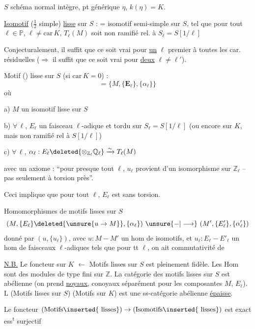 $S$ schéma normal intègre, pt générique $\eta$, $k(\eta)=K$.

\uline{Isomotif} ($\frac12$ simple) \uline{lisse} sur $S$ : = isomotif semi-simple  sur $S$, tel que pour tout $\ell\in\mathbb P$, $\ell\ne\mathrm{car}\,K$, $T_\ell(M)$ soit non ramifié rel. à $S_\ell=S[1/\ell]$

Conjecturalement, il suffit que ce soit vrai pour \uline{un} $\ell$ premier à toutes les car. résiduelles ($\Rightarrow$ il suffit que ce soit vrai pour \uline{deux} $\ell\ne\ell'$).

Motif () lisse sur $S$ (si $\mathrm{car}\,K=0$) :
\[
 =\{M,\{\mathbf{E}_\ell\},\{\alpha_\ell\}\}
\]
où

a) $M$ un isomotif lisse sur $S$

b) $\forall\,\ell$, $E_\ell$ un faisceau $\ell$-adique et tordu sur $S_\ell=S[1/\ell]$ (ou encore sur $K$, mais non ramifié rel à $S[1/\ell]$)

c) $\forall\,\ell$, $\alpha_\ell:E_\ell\deleted{\otimes_{\mathbb Z_\ell}\mathbb Q_\ell}\xrightarrow{\sim}T_\ell(M)$

avec un axiome : ``pour presque tout $\ell$, $u_\ell$ provient d'un isomorphisme sur $\mathbb Z_\ell$ -- pas seulement à torsion près''.

Ceci implique que pour  tout $\ell$, $E_\ell$ est sans torsion.

Homomorphismes de motifs lisses sur $S$
\[
 (M,\{E_\ell\}\deleted{\unsure{u\to M}},\{\alpha_\ell\})\ \unsure{\mathord{-}|\longrightarrow}\ (M',\{E'_\ell\},\{\alpha'_\ell\})
\]
donné par $(u,\{u_\ell\})$, avec $u:M-M'$ un hom de isomotifs, et $u_\ell:E_\ell-E'_\ell$ un hom de faisceaux $\ell$-adiques tels que pour tt $\ell$, on ait commutativité de

\uline{N.B.} Le foncteur   sur $K$ $\longleftarrow$ Motifs lisses sur $S$ est pleinement fidèle. Les Hom sont des modules de type fini sur $\mathbb Z$. La catégorie des motifs lisses sur $S$ est abélienne (on prend \uline{noyaux}, conoyaux séparément pour les composantes $M$, $E_\ell$). L  (Motifs lisses sur $S$)  (Motifs sur $K$) est une ss-catégorie abélienne \uline{épaisse}.

Le foncteur $(\text{Motifs}\inserted{\text{ lisses}})\to(\text{Isomotifs}\inserted{\text{ lisses}})$ est exact ess\textsuperscript{t} surjectif
